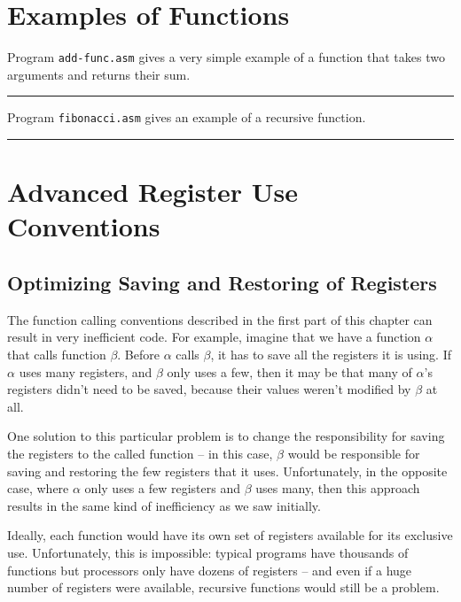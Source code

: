 \section{Examples of Functions}

\newpage
Program {\tt add-func.asm} gives a very simple example of a
function that takes two arguments and returns their sum.

\vspace{3mm}
\hrule
{}


\newpage
Program {\tt fibonacci.asm} gives an example of a recursive
function.

\vspace{3mm}
\hrule
{}


\newpage
\section{Advanced Register Use Conventions}

\subsection{Optimizing Saving and Restoring of Registers}

The function calling conventions described in the first part of this
chapter can result in very inefficient code.  For example, imagine
that we have a function $\alpha$ that calls function $\beta$.  Before
$\alpha$ calls $\beta$, it has to save all the registers it is using. 
If $\alpha$ uses many registers, and $\beta$ only uses a few, then it
may be that many of $\alpha$'s registers didn't need to be saved,
because their values weren't modified by $\beta$ at all.

One solution to this particular problem is to change the
responsibility for saving the registers to the called function -- in
this case, $\beta$ would be responsible for saving and restoring the
few registers that it uses.  Unfortunately, in the opposite case,
where $\alpha$ only uses a few registers and $\beta$ uses many, then
this approach results in the same kind of inefficiency as we saw
initially.

Ideally, each function would have its own set of registers available
for its exclusive use.  Unfortunately, this is impossible:  typical
programs have thousands of functions but processors only have dozens
of registers -- and even if a huge number of registers were available,
recursive functions would still be a problem.

